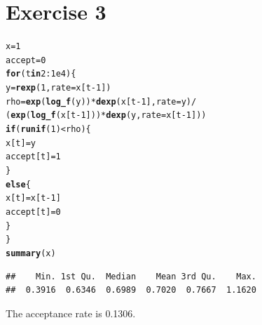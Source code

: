 \documentclass{article}\usepackage[]{graphicx}\usepackage[]{color}
\makeatletter
\newcommand{\hlnum}[1]{\textcolor[rgb]{0.686,0.059,0.569}{#1}}%
\newcommand{\hlopt}[1]{\textcolor[rgb]{0,0,0}{#1}}%
\newcommand{\hlstd}[1]{\textcolor[rgb]{0.345,0.345,0.345}{#1}}%
\newcommand{\hlkwa}[1]{\textcolor[rgb]{0.161,0.373,0.58}{\textbf{#1}}}%
\newcommand{\hlkwb}[1]{\textcolor[rgb]{0.69,0.353,0.396}{#1}}%
\newcommand{\hlkwc}[1]{\textcolor[rgb]{0.333,0.667,0.333}{#1}}%
\newcommand{\hlkwd}[1]{\textcolor[rgb]{0.737,0.353,0.396}{\textbf{#1}}}%
\newenvironment{kframe}{%
 \def\at@end@of@kframe{}%
 \ifinner\ifhmode%
  \def\at@end@of@kframe{\end{minipage}}%
  \begin{minipage}{\columnwidth}%
 \fi\fi%
 \def\FrameCommand##1{\hskip\@totalleftmargin \hskip-\fboxsep
 \colorbox{shadecolor}{##1}\hskip-\fboxsep
     \hskip-\linewidth \hskip-\@totalleftmargin \hskip\columnwidth}%
 \MakeFramed {\advance\hsize-\width
   \@totalleftmargin\z@ \linewidth\hsize
   \@setminipage}}%
 {\par\unskip\endMakeFramed%
 \at@end@of@kframe}
\newenvironment{knitrout}{}{} %
\makeatother
\begin{document}
\section*{Exercise 3}
\begin{knitrout}
\color{fgcolor}\begin{kframe}
\begin{alltt}
\hlstd{x} \hlkwb{=} \hlnum{1}
\hlstd{accept} \hlkwb{=} \hlnum{0}
\hlkwa{for}\hlstd{(t} \hlkwa{in} \hlnum{2}\hlopt{:}\hlnum{1e4}\hlstd{)\{}
  \hlstd{y} \hlkwb{=} \hlkwd{rexp}\hlstd{(}\hlnum{1}\hlstd{,} \hlkwc{rate} \hlstd{= x[t}\hlopt{-}\hlnum{1}\hlstd{])}
  \hlstd{rho} \hlkwb{=} \hlkwd{exp}\hlstd{(}\hlkwd{log_f}\hlstd{(y))}\hlopt{*}\hlkwd{dexp}\hlstd{(x[t}\hlopt{-}\hlnum{1}\hlstd{],} \hlkwc{rate} \hlstd{= y)}\hlopt{/}
    \hlstd{(}\hlkwd{exp}\hlstd{(}\hlkwd{log_f}\hlstd{(x[t}\hlopt{-}\hlnum{1}\hlstd{]))}\hlopt{*}\hlkwd{dexp}\hlstd{(y,} \hlkwc{rate} \hlstd{= x[t}\hlopt{-}\hlnum{1}\hlstd{]))}
    \hlkwa{if}\hlstd{(}\hlkwd{runif}\hlstd{(}\hlnum{1}\hlstd{)}\hlopt{<}\hlstd{rho)\{}
      \hlstd{x[t]} \hlkwb{=} \hlstd{y}
      \hlstd{accept[t]} \hlkwb{=} \hlnum{1}
    \hlstd{\}}
    \hlkwa{else}\hlstd{\{}
      \hlstd{x[t]} \hlkwb{=}\hlstd{x[t}\hlopt{-}\hlnum{1}\hlstd{]}
      \hlstd{accept[t]} \hlkwb{=} \hlnum{0}
  \hlstd{\}}
\hlstd{\}}
\hlkwd{summary}\hlstd{(x)}
\end{alltt}
\begin{verbatim}
##    Min. 1st Qu.  Median    Mean 3rd Qu.    Max. 
##  0.3916  0.6346  0.6989  0.7020  0.7667  1.1620
\end{verbatim}
\end{kframe}
\end{knitrout}
The acceptance rate is 0.1306.
\end{document}
